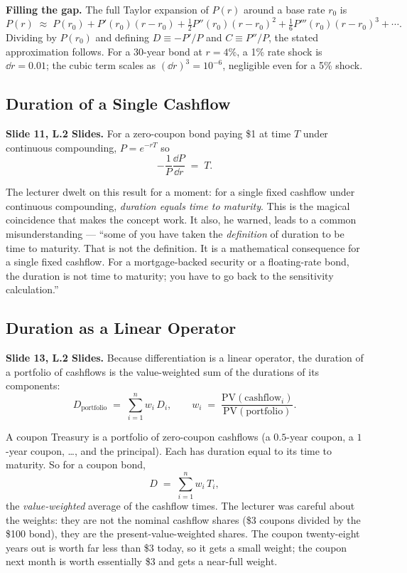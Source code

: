 \begin{tipblock}
\textbf{Filling the gap.} The full Taylor expansion of $P(r)$ around a base
rate $r_0$ is
\[
  P(r) \;\approx\; P(r_0) + P'(r_0)(r-r_0) + \tfrac{1}{2}P''(r_0)(r-r_0)^2
  + \tfrac{1}{6}P'''(r_0)(r-r_0)^3 + \cdots.
\]
Dividing by $P(r_0)$ and defining $D \equiv -P'/P$ and $C \equiv P''/P$, the
stated approximation follows. For a 30-year bond at $r=4\%$, a 1\% rate
shock is $\dd r = 0.01$; the cubic term scales as $(\dd r)^3 = 10^{-6}$,
negligible even for a 5\% shock.
\end{tipblock}

\subsection{Duration of a Single Cashflow}\label{L2-sec:duration-single}

\textbf{Slide 11, L.2 Slides.} For a zero-coupon bond paying \$1 at time $T$
under continuous compounding, $P = e^{-rT}$ so
\[
  -\frac{1}{P}\frac{\dd P}{\dd r} \;=\; T.
\]

The lecturer dwelt on this result for a moment: for a single fixed cashflow
under continuous compounding, \emph{duration equals time to maturity}. This
is the magical coincidence that makes the concept work. It also, he warned,
leads to a common misunderstanding --- ``some of you have taken the
\emph{definition} of duration to be time to maturity. That is not the
definition. It is a mathematical consequence for a single fixed cashflow. For
a mortgage-backed security or a floating-rate bond, the duration is not time
to maturity; you have to go back to the sensitivity calculation.''

\subsection{Duration as a Linear Operator}\label{L2-sec:duration-linear}

\textbf{Slide 13, L.2 Slides.} Because differentiation is a linear operator,
the duration of a portfolio of cashflows is the value-weighted sum of the
durations of its components:
\[
  D_{\text{portfolio}} \;=\; \sum_{i=1}^{n} w_i\,D_i,
  \qquad
  w_i \;=\; \frac{\text{PV}(\text{cashflow}_i)}{\text{PV}(\text{portfolio})}.
\]

A coupon Treasury is a portfolio of zero-coupon cashflows (a $0.5$-year
coupon, a $1$-year coupon, \ldots, and the principal). Each has duration
equal to its time to maturity. So for a coupon bond,
\[
  D \;=\; \sum_{i=1}^{n} w_i\,T_i,
\]
the \emph{value-weighted} average of the cashflow times. The lecturer was
careful about the weights: they are not the nominal cashflow shares (\$3
coupons divided by the \$100 bond), they are the present-value-weighted
shares. The coupon twenty-eight years out is worth far less than \$3 today,
so it gets a small weight; the coupon next month is worth essentially \$3
and gets a near-full weight.

